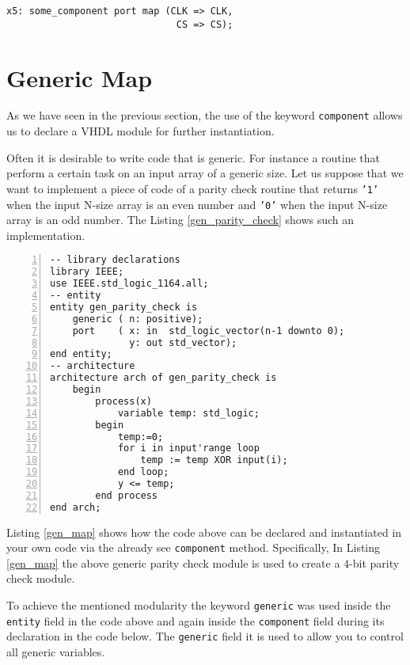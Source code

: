 \noindent
\begin{minipage}{0.99\linewidth}
\begin{lstlisting}[label=ex22_code_same_sig, caption=Example of the same signal name crossing hierarchical boundaries.]
x5: some_component port map (CLK => CLK,
                              CS => CS); 
\end{lstlisting}
\end{minipage}


\section{Generic Map}
As we have seen in the previous section, the use of the keyword \texttt{component} allows us to declare a VHDL module for further instantiation.

Often it is desirable to write code that is generic. For instance a routine that perform a certain task on an input array of a generic size. Let us suppose that we want to implement a piece of code of a parity check routine that returns \texttt{'1'} when the input N-size array is an even number and \texttt{'0'} when the input N-size array is an odd number. The Listing \ref{gen_parity_check} shows such an implementation.

\noindent
\begin{minipage}{0.99\linewidth}
\begin{lstlisting}[numbers=left, label=gen_parity_check, caption= Parity check implementation with generic input array size.]
-- library declarations
library IEEE;
use IEEE.std_logic_1164.all;
-- entity
entity gen_parity_check is
    generic ( n: positive);
    port    ( x: in  std_logic_vector(n-1 downto 0);
              y: out std_vector);
end entity;
-- architecture
architecture arch of gen_parity_check is
    begin
        process(x)
            variable temp: std_logic;
        begin
            temp:=0;
            for i in input'range loop
                temp := temp XOR input(i);
            end loop;
            y <= temp;
        end process
end arch;
\end{lstlisting}
\end{minipage}

Listing \ref{gen_map} shows how the code above can be declared and instantiated in your own code via the already see \texttt{component} method. Specifically, In Listing \ref{gen_map} the above generic parity check module is used to create a 4-bit parity check module.

To achieve the mentioned modularity the keyword \texttt{generic} was used inside the \texttt{entity} field in the code above and again inside the \texttt{component} field during its declaration in the code below. The \texttt{generic} field it is used to allow you to control all generic variables.

